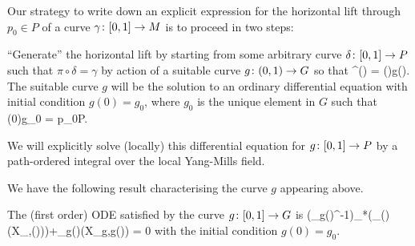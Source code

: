 Our strategy to write down an explicit expression for the horizontal lift through $p_0\in P$ of a curve $\gamma\colon [0,1]\to M$ is to proceed in two steps:
\ben[label=\roman*)]
\item ``Generate'' the horizontal lift by starting from some arbitrary curve $\delta\colon [0,1]\to P$ such that $\pi\circ \delta = \gamma$ by action of a suitable curve $g\colon (0,1)\to G$ so that
\bse
\gamma^\uparrow(\lambda) = \delta(\lambda)\racts g(\lambda).
\ese
The suitable curve $g$ will be the solution to an ordinary differential equation with initial condition $g(0)=g_0$, where $g_0$ is the unique element in $G$ such that
\bse
\delta(0)\racts g_0 = p_0\in P.
\ese
\item We will explicitly solve (locally) this differential equation for $g\colon [0,1]\to P$ by a path-ordered integral over the local Yang-Mills field.
\een

We have the following result characterising the curve $g$ appearing above.

\bt
The (first order) ODE satisfied by the curve $g\colon[0,1]\to G$ is
\bse
(\Ad_{g(\lambda)^{-1}})_*(\omega_{\delta(\lambda)}(X_{\delta,\delta(\lambda)}))+\Xi_{g(\lambda)}(X_{g,g(\lambda)}) = 0
\ese
with the initial condition $g(0)=g_0$.
\et

